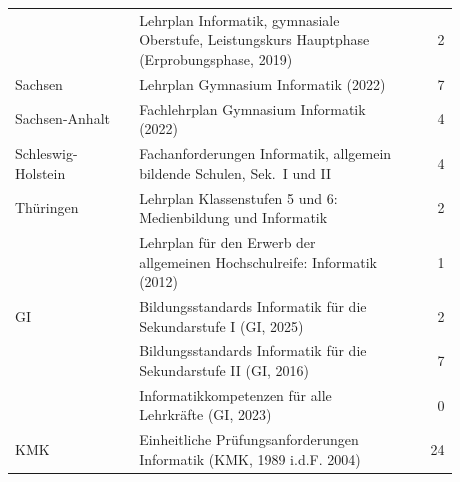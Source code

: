 \begin{longtable}{@{}p{0.28\linewidth}p{0.6\linewidth}r@{}}
 & Lehrplan Informatik, gymnasiale Oberstufe, Leistungskurs Hauptphase (Erprobungsphase, 2019) \parencite{Saarland2019} & 2 \\
Sachsen & Lehrplan Gymnasium Informatik (2022) \parencite{LSB2022} & 7 \\
Sachsen-Anhalt & Fachlehrplan Gymnasium Informatik (2022) \parencite{Burgemeister2022} & 4 \\
Schleswig-Holstein & Fachanforderungen Informatik, allgemein bildende Schulen, Sek.\ I und II \parencite{MinisteriumBildung2021} & 4 \\
Thüringen & Lehrplan Klassenstufen 5 und 6: Medienbildung und Informatik \parencite{TMBJS2024} & 2 \\
 & Lehrplan für den Erwerb der allgemeinen Hochschulreife: Informatik (2012) \parencite{Thueringen2012} & 1 \\
GI & Bildungsstandards Informatik für die Sekundarstufe I (GI, 2025) \parencite{GI2019} & 2 \\
 & Bildungsstandards Informatik für die Sekundarstufe II (GI, 2016) \parencite{Roehner2016} & 7 \\
 & Informatikkompetenzen für alle Lehrkräfte (GI, 2023) \parencite{GI2023} & 0 \\
KMK & Einheitliche Prüfungsanforderungen Informatik (KMK, 1989 i.d.F. 2004) \parencite{KMK2004} & 24 \\
\end{longtable}
